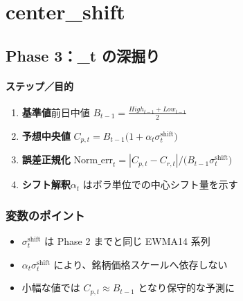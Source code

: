 
\section*{center\_shift}\nopagebreak[4]

\subsection*{Phase 3：\alpha_t の深掘り}\nopagebreak[4]
\paragraph{ステップ／目的}
\begin{flushleft}
\begin{enumerate}
  \item \textbf{基準値}\;前日中値
        \(B_{t-1}=\tfrac{High_{t-1}+Low_{t-1}}{2}\)
  \item \textbf{予想中央値}\;
        \(C_{p,t}=B_{t-1}\bigl(1+\alpha_t\sigma_t^{\mathrm{shift}}\bigr)\)
  \item \textbf{誤差正規化}\;
        \(\mathrm{Norm\_err}_t
          =|C_{p,t}-C_{r,t}|\big/\bigl(B_{t-1}\sigma_t^{\mathrm{shift}}\bigr)\)
  \item \textbf{シフト解釈}\;\(\alpha_t\) はボラ単位での中心シフト量を示す
\end{enumerate}
\end{flushleft}

\subsubsection*{変数のポイント}
\begin{flushleft}
\begin{itemize}
  \item \(\sigma_t^{\mathrm{shift}}\) は Phase 2 までと同じ EWMA14 系列
  \item \(\alpha_t\sigma_t^{\mathrm{shift}}\) により、銘柄価格スケールへ依存しない
  \item 小幅な値では \(C_{p,t}\approx B_{t-1}\) となり保守的な予測に
\end{itemize}
\end{flushleft}

